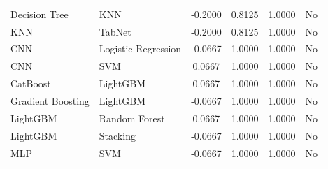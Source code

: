 \documentclass[a4paper,fleqn]{cas-sc}
\begin{document}
\begin{longtable}{l l c c c c}
Decision Tree & KNN & -0.2000 & 0.8125 & 1.0000 & No \\
KNN & TabNet & -0.2000 & 0.8125 & 1.0000 & No \\
CNN & Logistic Regression & -0.0667 & 1.0000 & 1.0000 & No \\
CNN & SVM & 0.0667 & 1.0000 & 1.0000 & No \\
CatBoost & LightGBM & 0.0667 & 1.0000 & 1.0000 & No \\
Gradient Boosting & LightGBM & -0.0667 & 1.0000 & 1.0000 & No \\
LightGBM & Random Forest & 0.0667 & 1.0000 & 1.0000 & No \\
LightGBM & Stacking & -0.0667 & 1.0000 & 1.0000 & No \\
MLP & SVM & -0.0667 & 1.0000 & 1.0000 & No \\

\end{longtable}
\endgroup


\newpage
\end{document}
